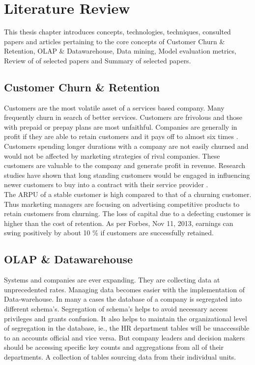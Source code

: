 \setlength{\footskip}{8mm}

\chapter{Literature Review} 
\label{ch:literature-review}

This thesis chapter introduces concepts, technologies, techniques, consulted papers and articles pertaining to the core concepts of Customer Churn \& Retention, OLAP \& Datawarehouse, Data mining, Model evaluation metrics, Review of of selected papers and Summary of selected papers.

\section{Customer Churn \& Retention}
Customers are the most volatile asset of a services based company. Many frequently churn in search of better services. Customers are frivolous and those with prepaid or prepay plans are most unfaithful. Companies are generally in profit if they are able to retain customers and it pays off to almost six times . Customers spending longer durations with a company are not easily churned and would not be affected by marketing strategies of rival companies. These customers are valuable to the company and generate profit in revenue. Research studies  have shown that long standing customers would be engaged in influencing newer customers to buy into a contract with their service provider .\\
The ARPU of a stable customer is high compared to that of a churning customer. Thus marketing managers are focusing on advertising competitive products to retain customers from churning. The loss of capital due to a defecting customer is higher than the cost of retention. As per Forbes, Nov 11, 2013, earnings can swing positively by about 10 \% if customers are successfully retained.

\section{OLAP \& Datawarehouse }
Systems and companies are ever expanding. They are collecting data at unprecedented rates. Managing data becomes easier with the implementation of Data-warehouse. In many a cases the database of a company is segregated into different schema's. Segregation of schema's helps to avoid necessary access privileges and grants confusion. It also helps to maintain the organizational level of segregation in the database, ie., the HR department tables will be unaccessible to an accounts official and vice versa. But company leaders and decision makers should be accessing specific key counts and aggregations from all of their departments. A collection of tables sourcing data from their individual units.\\

